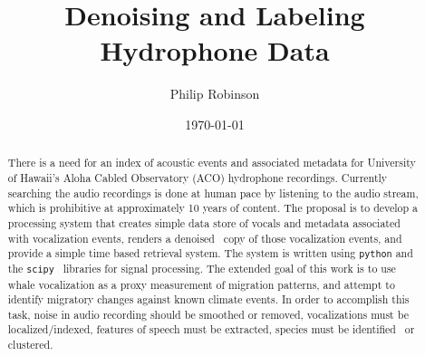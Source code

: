 \documentclass{article}
\title{Denoising and Labeling Hydrophone Data}
\date{\today}
\author{Philip Robinson}
\affil{Oregon Health Sciences University}
\begin{document}
\maketitle


\begin{abstract}
  There is a need for an index of acoustic events and associated metadata for University of Hawaii's Aloha Cabled Observatory (ACO) hydrophone recordings. Currently searching the audio recordings is done at human pace by listening to the audio stream, which is prohibitive at approximately 10 years of content.
The proposal is to develop a processing system that creates simple data store of vocals and metadata associated with vocalization events, renders a denoised~\cite{Baskar2015StudyOD,specsub2008,Berouti1979EnhancementOS} copy of those vocalization events, and provide a simple time based retrieval system. The system is written using \texttt{python} and the \texttt{scipy}~\cite{Jones2001} libraries for signal processing. %
 The extended goal of this work is to use whale vocalization as a proxy measurement of migration patterns, and attempt to identify migratory changes against known climate events. In order to accomplish this task, noise in audio recording should be smoothed or removed, vocalizations must be localized/indexed, features of speech must be extracted, species must be identified~\cite{2014ASAJ} or clustered.
\end{abstract}
\end{document}
